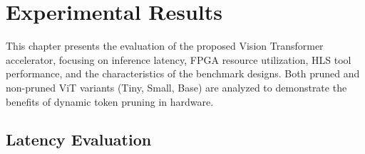 














\chapter{Experimental Results}

This chapter presents the evaluation of the proposed Vision Transformer accelerator, focusing on inference latency, FPGA resource utilization, HLS tool performance, and the characteristics of the benchmark designs. Both pruned and non-pruned ViT variants (Tiny, Small, Base) are analyzed to demonstrate the benefits of dynamic token pruning in hardware.

\section{Latency Evaluation}

